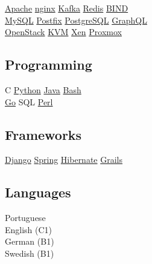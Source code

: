 \documentclass[]{willianpaixao-resume}
\begin{document}
\begin{minipage}[t]{0.35\textwidth}
\href{https://httpd.apache.org/}{Apache}\textbullet{}
\href{https://nginx.org/}{nginx}\textbullet{}
\href{https://kafka.apache.org/}{Kafka}\textbullet{}
\href{https://redis.io/}{Redis}\textbullet{}
\href{https://www.isc.org/bind/}{BIND}\\
\href{https://www.mysql.com/}{MySQL}\textbullet{}
\href{https://www.postfix.org/}{Postfix}\textbullet{}
\href{https://www.postgresql.org/}{PostgreSQL}\textbullet{}
\href{https://graphql.org/}{GraphQL}\\
\href{https://www.openstack.org/}{OpenStack}\textbullet{}
\href{https://linux-kvm.org/}{KVM}\textbullet{}
\href{https://xenproject.org/}{Xen} \textbullet{}
\href{https://www.proxmox.com/}{Proxmox}\\
\sectionsep

\subsection{Programming}
C\textbullet
\href{http://www.python.org}{Python}\textbullet{}
\href{https://www.oracle.com/java/}{Java}\textbullet{}
\href{https://www.gnu.org/software/bash/}{Bash}\\
\href{https://go.dev/}{Go}\textbullet{}
SQL\textbullet{}
\href{https://www.perl.org/}{Perl}
\sectionsep

\subsection{Frameworks}
\href{https://www.djangoproject.com/}{Django}\textbullet{}
\href{https://spring.io/}{Spring}\textbullet{}
\href{https://hibernate.org/}{Hibernate}\textbullet{}
\href{https://grails.org/}{Grails}
\sectionsep

\subsection{Languages}
Portuguese\\
English (C1)\\
German (B1)\\
Swedish (B1)


\end{minipage} 
\hfill
\end{document}
